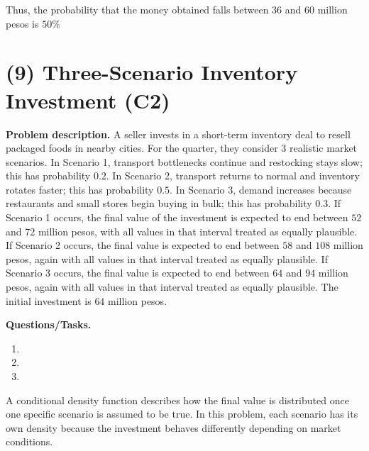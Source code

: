 Thus, the probability that the money obtained falls between $36$ and $60$ million pesos is $50\%$



\section{(9) Three-Scenario Inventory Investment (C2)}
\label{sec:three-scenario-inventory-investment-c2}

\textbf{Problem description.}
A seller invests in a short-term inventory deal to resell packaged foods in nearby cities. For the quarter, they consider 3 realistic market scenarios. In Scenario 1, transport bottlenecks continue and restocking stays slow; this has probability $0.2$. In Scenario 2, transport returns to normal and inventory rotates faster; this has probability $0.5$. In Scenario 3, demand increases because restaurants and small stores begin buying in bulk; this has probability $0.3$. If Scenario 1 occurs, the final value of the investment is expected to end between $52$ and $72$ million pesos, with all values in that interval treated as equally plausible. If Scenario 2 occurs, the final value is expected to end between $58$ and $108$ million pesos, again with all values in that interval treated as equally plausible. If Scenario 3 occurs, the final value is expected to end between $64$ and $94$ million pesos, again with all values in that interval treated as equally plausible. The initial investment is $64$ million pesos.

\textbf{Questions/Tasks.}
\begin{enumerate}[label=\textbf{\alph*)}]
	\item {}
	\item {}
	\item {}
\end{enumerate}

A conditional density function describes how the final value is distributed once one specific scenario is assumed to be true. In this problem, each scenario has its own density because the investment behaves differently depending on market conditions.

